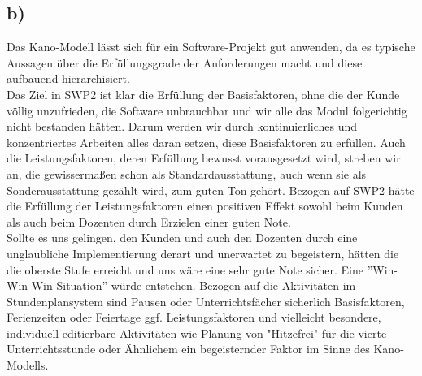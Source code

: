 \documentclass{swp1}
\begin{document}
\subsection*{b)}
Das Kano-Modell lässt sich für ein Software-Projekt gut anwenden, da es typische Aussagen über die Erfüllungsgrade der Anforderungen macht und diese aufbauend hierarchisiert. \\
Das Ziel in SWP2 ist klar die Erfüllung der Basisfaktoren, ohne die der Kunde völlig unzufrieden, die Software unbrauchbar und wir alle das Modul folgerichtig nicht bestanden hätten. Darum werden wir durch kontinuierliches und konzentriertes Arbeiten alles daran setzen, diese Basisfaktoren zu erfüllen. Auch die Leistungsfaktoren, deren Erfüllung bewusst vorausgesetzt wird, streben wir an, die gewissermaßen schon als Standardausstattung, auch wenn sie als Sonderausstattung gezählt wird, zum guten Ton gehört. Bezogen auf SWP2 hätte die Erfüllung der Leistungsfaktoren einen positiven Effekt sowohl beim Kunden als auch beim Dozenten durch Erzielen einer guten Note.\\
Sollte es uns gelingen, den Kunden und auch den Dozenten durch eine unglaubliche Implementierung derart und unerwartet zu begeistern, hätten die die oberste Stufe erreicht und uns wäre eine sehr gute Note sicher. Eine ''Win-Win-Win-Situation'' würde entstehen. 
Bezogen auf die Aktivitäten im Stundenplansystem sind Pausen oder Unterrichtsfächer sicherlich Basisfaktoren, Ferienzeiten oder Feiertage ggf. Leistungsfaktoren und vielleicht besondere, individuell editierbare Aktivitäten wie Planung von "Hitzefrei" für die vierte Unterrichtsstunde oder Ähnlichem  ein begeisternder Faktor im Sinne des Kano-Modells.
\end{document}
